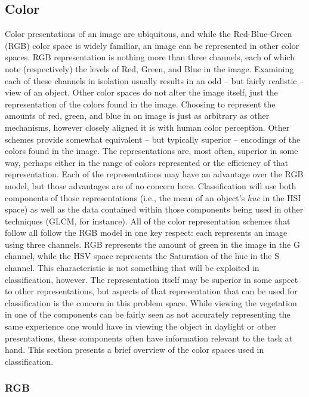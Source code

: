 \documentclass[letterpaper]{article}
\begin{document}
{\subsection{Color}
Color presentations of an image are ubiquitous, and while the Red-Blue-Green (RGB) color space is widely familiar, an image can be represented in other color spaces. RGB representation is nothing more than three channels, each of which note (respectively) the levels of Red, Green, and Blue in the image.  Examining each of these channels in isolation usually results in an odd -- but fairly realistic -- view of an object. Other color spaces do not alter the image itself, just the representation of the colors found in the image.  Choosing to represent the amounts of red, green, and blue in an image is just as arbitrary as other mechanisms, however closely aligned it is with human color perception. Other schemes provide somewhat equivalent -- but typically superior -- encodings of the colors found in the image. The representations are, most often, superior in some way, perhaps either in the range of colors represented or the efficiency of that representation. Each of the representations may have an advantage over the RGB model, but those advantages are of no concern here. Classification will use both components of those representations (i.e., the mean of an object's \textit{hue} in the HSI space) as well as the data contained within those components being used in other techniques (GLCM, for instance). All of the color representation schemes that follow all follow the RGB model in one key respect: each represents an image using three channels. RGB represents the amount of green in the image in the G channel, while the HSV space represents the Saturation of the hue in the S channel. This characteristic is not something that will be exploited in classification, however. The representation itself may be superior in some aspect to other representations, but aspects of that representation that can be used for classification is the concern in this problem space. While viewing the vegetation in one of the components can be fairly seen as not accurately representing the same experience one would have in viewing the object in daylight or other presentations, these components often have information relevant to the task at hand. This section presents a brief overview of the color spaces used in classification.

\subsubsection{RGB}

}
\end{document}
